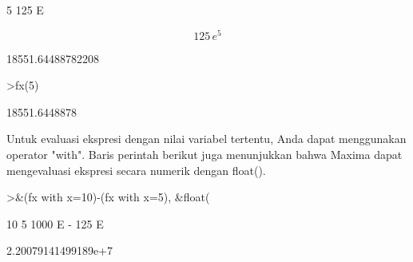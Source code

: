 \documentclass[a4paper,10pt]{article}
\begin{document}
\begin{eulernotebook}
\begin{eulercomment}
\begin{eulercomment}
\begin{euleroutput}
                                       5
                                  125 E
  
\end{euleroutput}
\begin{eulerformula}
\[
125\,e^5
\]
\end{eulerformula}
\begin{euleroutput}
  
                            18551.64488782208
  
\end{euleroutput}
\begin{eulerprompt}
>fx(5)
\end{eulerprompt}
\begin{euleroutput}
  18551.6448878
\end{euleroutput}
\begin{eulercomment}
Untuk evaluasi ekspresi dengan nilai variabel tertentu, Anda dapat
menggunakan operator "with". Baris perintah berikut juga menunjukkan
bahwa Maxima dapat mengevaluasi ekspresi secara numerik dengan
float().
\end{eulercomment}
\begin{eulerprompt}
>&(fx with x=10)-(fx with x=5), &float(%
\end{eulerprompt}
\begin{euleroutput}
  
                                  10        5
                            1000 E   - 125 E
  
  
                           2.20079141499189e+7
  

\end{euleroutput}
\end{eulercomment}
\end{eulercomment}
\end{eulernotebook}
\end{document}
